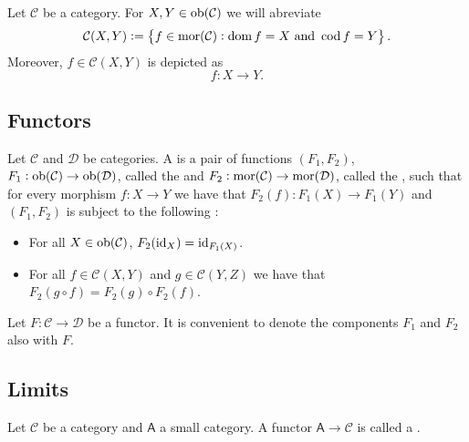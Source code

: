 \begin{remark}
	Let $\mathcal{C}$ be a category. For $X,Y \in \operatorname{ob}(\mathcal{C})$ we will abreviate
	\begin{equation*}
		\mathcal{C}(X,Y) := \cbr{f \in \mor(\mathcal{C}) : \dom f = X \text{ and } \cod f = Y}.
	\end{equation*}
	Moreover, $f \in \mathcal{C}(X,Y)$ is depicted as
	\begin{equation}
		f : X \to Y.
	\end{equation}
\end{remark}

\subsection{Functors}

\begin{definition}[Functor]
	Let $\mathcal{C}$ and $\mathcal{D}$ be categories. A  is a pair of functions $(F_1,F_2)$, $F_1 : \operatorname{ob}(\mathcal{C}) \to \operatorname{ob}(\mathcal{D})$, called the  and $F_2 : \operatorname{mor}(\mathcal{C}) \to \operatorname{mor}(\mathcal{D})$, called the , such that for every morphism $f : X \to Y$ we have that $F_2(f) : F_1(X) \to F_1(Y)$ and $(F_1,F_2)$ is subject to the following :
	\begin{itemize}[leftmargin = *]
		\item For all $X \in \operatorname{ob}(\mathcal{C})$, $F_2(\operatorname{id}_X) = \operatorname{id}_{F_1(X)}$.
		\item For all $f \in \mathcal{C}(X,Y)$ and $g \in \mathcal{C}(Y,Z)$ we have that $F_2(g \circ f) = F_2(g) \circ F_2(f)$.
	\end{itemize}
\end{definition}

\begin{remark}
	Let $F : \mathcal{C} \to \mathcal{D}$ be a functor. It is convenient to denote the components $F_1$ and $F_2$ also with $F$.
\end{remark}

\subsection{Limits}

\begin{definition}[Diagram]
	Let $\mathcal{C}$ be a category and $\mathsf{A}$ a small category. A functor $\mathsf{A} \to \mathcal{C}$ is called a .
\end{definition}

